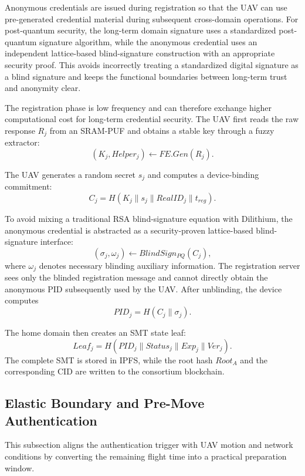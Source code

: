 \documentclass[lettersize,journal]{IEEEtran}
\begin{document}
	Anonymous credentials are issued during registration so that the UAV can use pre-generated credential material during subsequent cross-domain operations. For post-quantum security, the long-term domain signature uses a standardized post-quantum signature algorithm, while the anonymous credential uses an independent lattice-based blind-signature construction with an appropriate security proof. This avoids incorrectly treating a standardized digital signature as a blind signature and keeps the functional boundaries between long-term trust and anonymity clear.
	
	The registration phase is low frequency and can therefore exchange higher computational cost for long-term credential security. The UAV first reads the raw response $R_j$ from an SRAM-PUF and obtains a stable key through a fuzzy extractor:
	\begin{equation}
		(K_j,Helper_j)\leftarrow FE.Gen(R_j).
	\end{equation}
	
	The UAV generates a random secret $s_j$ and computes a device-binding commitment:
	\begin{equation}
		C_j=H(K_j\parallel s_j\parallel RealID_j\parallel t_{reg}).
	\end{equation}
	
	To avoid mixing a traditional RSA blind-signature equation with Dilithium, the anonymous credential is abstracted as a security-proven lattice-based blind-signature interface:
	\begin{equation}
		(\sigma_j,\omega_j)\leftarrow BlindSign_{PQ}(C_j),
	\end{equation}
	where $\omega_j$ denotes necessary blinding auxiliary information. The registration server sees only the blinded registration message and cannot directly obtain the anonymous PID subsequently used by the UAV. After unblinding, the device computes
	\begin{equation}
		PID_j=H(C_j\parallel \sigma_j).
	\end{equation}
	
	The home domain then creates an SMT state leaf:
	\begin{equation}
		Leaf_j=H(PID_j\parallel Status_j\parallel Exp_j\parallel Ver_j).
	\end{equation}
	The complete SMT is stored in IPFS, while the root hash $Root_A$ and the corresponding CID are written to the consortium blockchain.
	
	\subsection{Elastic Boundary and Pre-Move Authentication}
	This subsection aligns the authentication trigger with UAV motion and network conditions by converting the remaining flight time into a practical preparation window.
	
\end{document}
